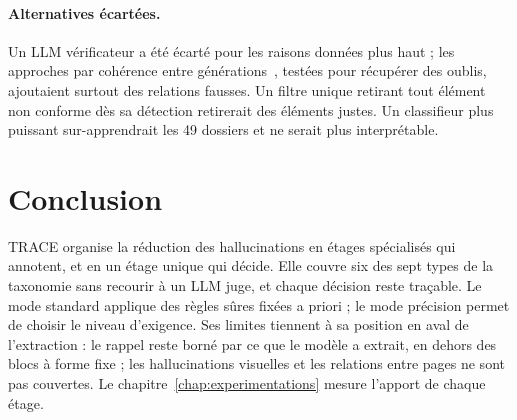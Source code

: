 \paragraph{Alternatives écartées.} Un LLM vérificateur a été écarté pour les raisons données plus haut ; les approches par cohérence entre générations~\cite{wang2023selfconsistency,manakul2023selfcheckgpt}, testées pour récupérer des oublis, ajoutaient surtout des relations fausses. Un filtre unique retirant tout élément non conforme dès sa détection retirerait des éléments justes. Un classifieur plus puissant sur-apprendrait les 49 dossiers et ne serait plus interprétable.

\section{Conclusion}\label{sec:c5-conclusion}

TRACE organise la réduction des hallucinations en étages spécialisés qui annotent, et en un étage unique qui décide. Elle couvre six des sept types de la taxonomie sans recourir à un LLM juge, et chaque décision reste traçable. Le mode standard applique des règles sûres fixées a priori ; le mode précision permet de choisir le niveau d'exigence. Ses limites tiennent à sa position en aval de l'extraction : le rappel reste borné par ce que le modèle a extrait, en dehors des blocs à forme fixe ; les hallucinations visuelles et les relations entre pages ne sont pas couvertes. Le chapitre~\ref{chap:experimentations} mesure l'apport de chaque étage.
